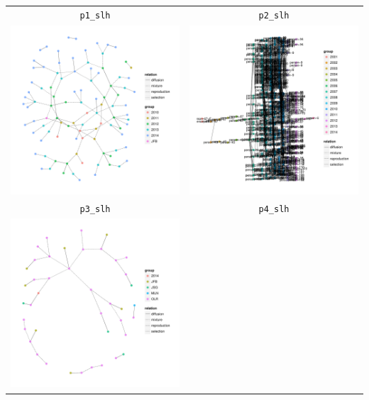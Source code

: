 \documentclass{article}\usepackage[]{graphicx}\usepackage[]{color}
\newenvironment{knitrout}{}{} %
\begin{document}
\begin{itemize}
\begin{center}
\begin{tabular}{cc}
\texttt{p1\_slh} & \texttt{p2\_slh} \\
\begin{knitrout}
\definecolor{shadecolor}{rgb}{0.969, 0.969, 0.969}\color{fgcolor}

{\centering \includegraphics[width=.4\textwidth]{figures/shinemas2R_unnamed-chunk-26-1} 

}



\end{knitrout}
&
\begin{knitrout}
\definecolor{shadecolor}{rgb}{0.969, 0.969, 0.969}\color{fgcolor}

{\centering \includegraphics[width=.4\textwidth]{figures/shinemas2R_unnamed-chunk-27-1} 

}



\end{knitrout}
\\
\texttt{p3\_slh} & \texttt{p4\_slh} \\
\begin{knitrout}
\definecolor{shadecolor}{rgb}{0.969, 0.969, 0.969}\color{fgcolor}

{\centering \includegraphics[width=.4\textwidth]{figures/shinemas2R_unnamed-chunk-28-1} 

}
\end{knitrout}
\end{tabular}
\end{center}
\end{itemize}
\end{document}

